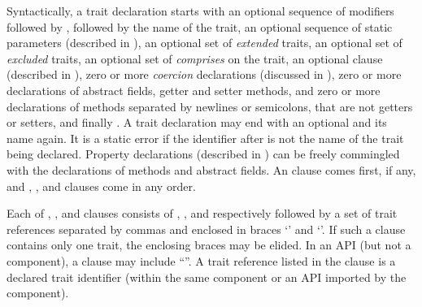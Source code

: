 Syntactically, a trait declaration starts with
an optional sequence of modifiers followed by
, followed by the name of the trait,
an optional sequence of static parameters (described in
),
an optional set of \emph{extended} traits,
an optional set of \emph{excluded} traits,
an optional set of \emph{comprises} on the trait,
an optional  clause (described in ),
zero or more \emph{coercion} declarations
(discussed in ),
zero or more declarations of abstract fields,
getter and setter methods,
and zero or more declarations of methods
separated by newlines or semicolons,
that are not getters or setters,
and finally .
A trait declaration may end with an optional  and its name again.
It is a static error if the identifier after  is not the name of the trait being declared.
Property declarations (described in ) can be freely
commingled with the declarations of methods and abstract fields.
An  clause comes first, if any, and
,
,
and 
clauses come in any order.

Each of , , and  clauses consists
of , , and 
respectively followed by a set of trait references
separated by commas and enclosed in braces `\txt{\{}' and `\txt{\}}'.
If such a clause contains only one trait, the enclosing braces may be elided.
In an API (but not a component),
a  clause may include ``\EXP{\ldots}''.
A trait reference listed in the  clause is a declared
trait identifier (within the same component or an API imported by the
component).


